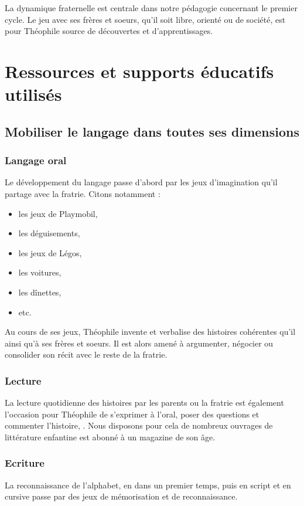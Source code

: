 \documentclass[french]{article}
\begin{document}
	La dynamique fraternelle est centrale dans notre pédagogie concernant le premier cycle. Le jeu avec ses frères et soeurs, qu'il soit libre, orienté ou de société, est pour Théophile source de découvertes et d'apprentissages.
	
	\section{Ressources et supports éducatifs utilisés}
	\subsection{Mobiliser le langage dans toutes ses dimensions}
	\subsubsection{Langage oral}
	Le développement du langage passe d'abord par les jeux d'imagination qu'il partage avec la fratrie. Citons notamment :
	\begin{itemize}
		\item les jeux de Playmobil,
		\item les déguisements,
		\item les jeux de Légos,
		\item les voitures,
		\item les dînettes,
		\item etc.
	\end{itemize}
	Au cours de ses jeux, Théophile invente et verbalise des histoires cohérentes qu'il  ainsi qu'à ses frères et soeurs. Il est alors amené à argumenter, négocier ou consolider son récit avec le reste de la fratrie.
		\subsubsection{Lecture}
	La lecture quotidienne des histoires par les parents ou la fratrie est également l'occasion pour Théophile de s'exprimer à l'oral, poser des questions et commenter l'histoire, . Nous disposons pour cela de nombreux ouvrages de littérature enfantine est  abonné à un magazine de son âge.
			\subsubsection{Ecriture}
	La reconnaissance de l'alphabet, en  dans un premier temps, puis en script et en cursive  passe par des jeux de mémorisation et de reconnaissance.\\
	
\end{document}
